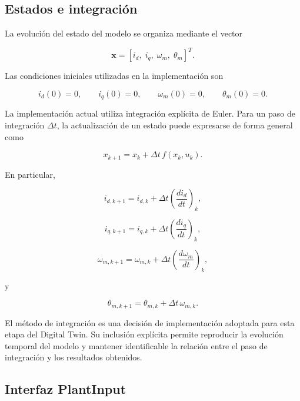 \subsection{Estados e integración}

La evolución del estado del modelo se organiza mediante el vector

\begin{equation}
\mathbf{x}
=
[i_d,\;i_q,\;\omega_m,\;\theta_m]^T.
\end{equation}

Las condiciones iniciales utilizadas en la implementación son

\begin{equation}
i_d(0)=0,
\qquad
i_q(0)=0,
\qquad
\omega_m(0)=0,
\qquad
\theta_m(0)=0.
\end{equation}

La implementación actual utiliza integración explícita de Euler. Para un paso de integración $\Delta t$, la actualización de un estado puede expresarse de forma general como

\begin{equation}
x_{k+1}
=
x_k+\Delta t\,f(x_k,u_k).
\end{equation}

En particular,

\begin{equation}
i_{d,k+1}
=
i_{d,k}
+
\Delta t
\left(
\frac{di_d}{dt}
\right)_k,
\end{equation}

\begin{equation}
i_{q,k+1}
=
i_{q,k}
+
\Delta t
\left(
\frac{di_q}{dt}
\right)_k,
\end{equation}

\begin{equation}
\omega_{m,k+1}
=
\omega_{m,k}
+
\Delta t
\left(
\frac{d\omega_m}{dt}
\right)_k,
\end{equation}

y

\begin{equation}
\theta_{m,k+1}
=
\theta_{m,k}
+
\Delta t\,\omega_{m,k}.
\end{equation}

El método de integración es una decisión de implementación adoptada para esta etapa del Digital Twin. Su inclusión explícita permite reproducir la evolución temporal del modelo y mantener identificable la relación entre el paso de integración y los resultados obtenidos.

\subsection{Interfaz PlantInput}

